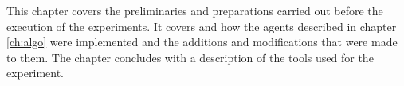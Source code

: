 This chapter covers the preliminaries and preparations carried out before the
execution of the experiments. It covers  and how the agents described in chapter
\ref{ch:algo} were implemented and the additions and modifications that were made to them. The chapter
concludes with a description of the tools used for the experiment.
